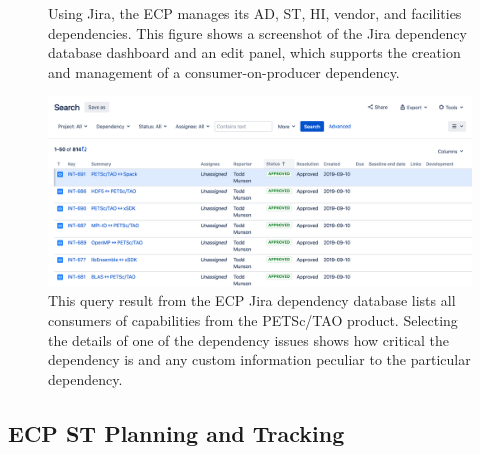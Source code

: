 \begin{figure}
	\centering
	\caption{Using Jira, the ECP manages its AD, ST, HI, vendor, and facilities dependencies.  This figure shows a screenshot of the Jira dependency database dashboard and an edit panel, which supports the creation and management of a consumer-on-producer dependency.}
	\label{fig:dependency-dashboard-edit}
\end{figure}

\begin{figure}
	\centering
	\includegraphics[width=0.9\linewidth]{PETSc-TAO-Dependencies}
	\caption{This query result from the ECP Jira dependency database lists all consumers of capabilities from the PETSc/TAO product. Selecting the details of one of the dependency issues shows how critical the dependency is and any custom information peculiar to the particular dependency.}
	\label{fig:petsc-tao-dependencies}
\end{figure}

\newpage
\subsection{ECP ST Planning and Tracking}


